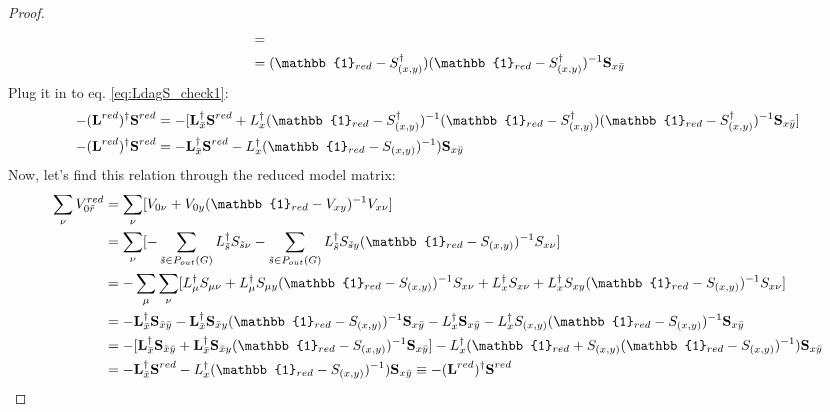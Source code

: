 \documentclass[a4paper]{article}
\theoremstyle{definition}
\begin{document}
\begin{enumerate}[label=(\roman*)]
\begin{proof}
\begin{align}
    & = \nonumber \\
    & = (\mathbb{1}_{red}-S^\dagger_{(x,y)})(\mathbb{1}_{red}-S^\dagger_{(x,y)})^{-1} \textbf{S}_{x\Bar{y}} \nonumber
\end{align}
Plug it in to eq. \ref{eq:LdagS_check1}:
\begin{align}
 -(\textbf{L}^{red})^\dagger\textbf{S}^{red} & = -[\textbf{L}^\dagger_{\Bar{x}} \textbf{S}^{red} + L^\dagger_x (\mathbb{1}_{red}-S^\dagger_{(x,y)})^{-1} (\mathbb{1}_{red}-S^\dagger_{(x,y)})(\mathbb{1}_{red}-S^\dagger_{(x,y)})^{-1} \textbf{S}_{x\Bar{y}}] \nonumber \\
    -(\textbf{L}^{red})^\dagger\textbf{S}^{red} & = -\textbf{L}_{\Bar{x}}^\dagger \textbf{S}^{red} - L_x^\dagger (\mathbb{1}_{red}-S_{(x,y)})^{-1}) \textbf{S}_{x\Bar{y}}
\end{align}
Now, let's find this relation through the reduced model matrix: 
\begin{align*}
    \sum_{\nu} V^{red}_{0\tilde{r}} & = \sum_{\nu}[V_{0\nu}+V_{0y}(\mathbb{1}_{red}-V_{xy})^{-1} V_{x\nu}] \\
   & = \sum_{\nu}[-\sum_{\tilde{s} \in P_{out}(G)} L_{\tilde{s}}^\dagger S_{\tilde{s}\nu} -\sum_{\tilde{s} \in P_{out}(G)} L_{\tilde{s}}^\dagger S_{\tilde{s}y} (\mathbb{1}_{red}-S_{(x,y)})^{-1} S_{x\nu}] \\
    & = -\sum_{\mu}\sum_{\nu} [L_{\mu}^\dagger S_{\mu \nu} + L_{\mu}^\dagger S_{\mu y} (\mathbb{1}_{red}-S_{(x,y)})^{-1} S_{x\nu} + L_x^\dagger S_{x \nu} + L_x^\dagger S_{xy}(\mathbb{1}_{red}-S_{(x,y)})^{-1}S_{x\nu} ] \\
    & = -\textbf{L}_{\Bar{x}}^\dagger \textbf{S}_{\Bar{x}\Bar{y}}- \textbf{L}_{\Bar{x}}^\dagger \textbf{S}_{\Bar{x}y} (\mathbb{1}_{red}-S_{(x,y)})^{-1} \textbf{S}_{x\Bar{y}} - L_x^\dagger \textbf{S}_{x\Bar{y}} - L_x^\dagger S_{(x,y)}(\mathbb{1}_{red}-S_{(x,y)})^{-1} \textbf{S}_{x\Bar{y}} \\
    & = -[\textbf{L}_{\Bar{x}}^\dagger \textbf{S}_{\Bar{x}\Bar{y}} + \textbf{L}_{\Bar{x}}^\dagger \textbf{S}_{\Bar{x}y} (\mathbb{1}_{red}-S_{(x,y)})^{-1} \textbf{S}_{x\Bar{y}}] - L_x^\dagger ( \mathbb{1}_{red} + S_{(x,y)}(\mathbb{1}_{red}-S_{(x,y)})^{-1}) \textbf{S}_{x\Bar{y}} \\
    & = -\textbf{L}_{\Bar{x}}^\dagger \textbf{S}^{red} - L_x^\dagger (\mathbb{1}_{red}-S_{(x,y)})^{-1}) \textbf{S}_{x\Bar{y}} \equiv -(\textbf{L}^{red})^\dagger\textbf{S}^{red} \nonumber
\end{align*}


\end{proof}
\end{enumerate}
\end{document}
